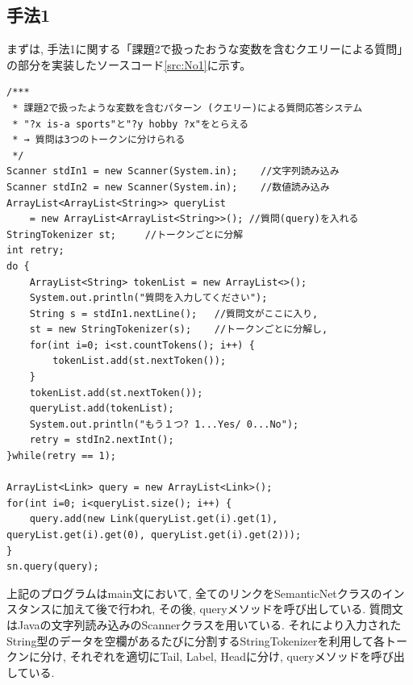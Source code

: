 ﻿\documentclass[uplatex,12pt]{jsarticle}
\begin{document}
\subsection{手法1}
まずは, 手法1に関する「課題2で扱ったおうな変数を含むクエリーによる質問」の部分を実装したソースコード\ref{src:No1}に示す。
\begin{lstlisting}[caption=クエリーの形に添った質問応答, label=src:No1]
/***
 * 課題2で扱ったような変数を含むパターン (クエリー)による質問応答システム
 * "?x is-a sports"と"?y hobby ?x"をとらえる
 * → 質問は3つのトークンに分けられる
 */
Scanner stdIn1 = new Scanner(System.in);	//文字列読み込み
Scanner stdIn2 = new Scanner(System.in);	//数値読み込み
ArrayList<ArrayList<String>> queryList 
    = new ArrayList<ArrayList<String>>(); //質問(query)を入れる
StringTokenizer st;		//トークンごとに分解
int retry;
do {
	ArrayList<String> tokenList = new ArrayList<>();
	System.out.println("質問を入力してください");
	String s = stdIn1.nextLine(); 	//質問文がここに入り,
	st = new StringTokenizer(s);	//トークンごとに分解し,
	for(int i=0; i<st.countTokens(); i++) {
		tokenList.add(st.nextToken());
	}
	tokenList.add(st.nextToken());
	queryList.add(tokenList);
	System.out.println("もう１つ? 1...Yes/ 0...No");
	retry = stdIn2.nextInt();
}while(retry == 1);

ArrayList<Link> query = new ArrayList<Link>();
for(int i=0; i<queryList.size(); i++) {
	query.add(new Link(queryList.get(i).get(1), queryList.get(i).get(0), queryList.get(i).get(2)));
}
sn.query(query);
\end{lstlisting}

上記のプログラムはmain文において, 全てのリンクをSemanticNetクラスのインスタンスに加えて後で行われ, その後, queryメソッドを呼び出している. 質問文はJavaの文字列読み込みのScannerクラスを用いている. それにより入力されたString型のデータを空欄があるたびに分割するStringTokenizerを利用して各トークンに分け, それぞれを適切にTail, Label, Headに分け, queryメソッドを呼び出している.\\
\end{document}
